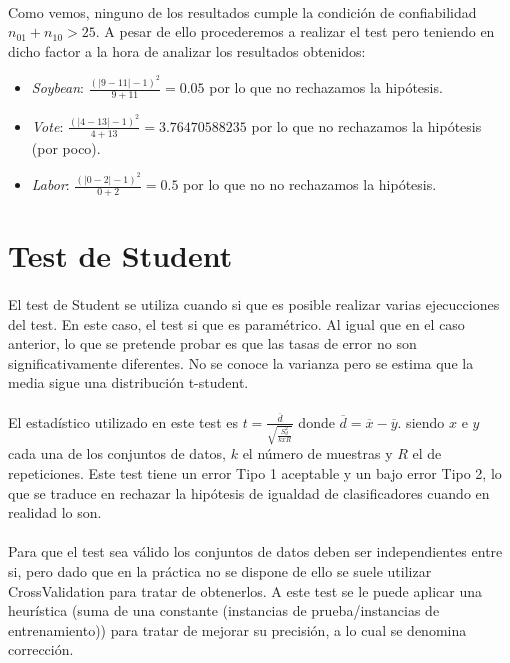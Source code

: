 \documentclass[10pt, a4paper,spanish]{article}
\begin{document}
		\paragraph{}
		Como vemos, ninguno de los resultados cumple la condición de confiabilidad $n_{01} + n_{10} > 25$. A pesar de ello procederemos a realizar el test pero teniendo en dicho factor a la hora de analizar los resultados obtenidos:

		\begin{itemize}
			\item \emph{Soybean}: $\frac{(|9-11|-1)^2}{9+11} = 0.05$ por lo que no rechazamos la hipótesis.
			\item \emph{Vote}: $\frac{(|4-13|-1)^2}{4+13} = 3.76470588235$ por lo que no rechazamos la hipótesis (por poco).
			\item \emph{Labor}: $\frac{(|0-2|-1)^2}{0+2} = 0.5$ por lo que no no rechazamos la hipótesis.
		\end{itemize}


	\section{Test de Student}

		\paragraph{}
		El test de Student se utiliza cuando si que es posible realizar varias ejecucciones del test. En este caso, el test si que es paramétrico. Al igual que en el caso anterior, lo que se pretende probar es que las tasas de error no son significativamente diferentes. No se conoce la varianza pero se estima que la media sigue una distribución t-student.

		\paragraph{}
		El estadístico utilizado en este test es $t = \frac{\overline{d}}{\sqrt{\frac{S^2_d}{k x R}}}$ donde $\overline{d} = \overline{x} - \overline{y}$. siendo $x$ e $y$ cada una de los conjuntos de datos, $k$ el número de muestras y $R$ el de repeticiones. Este test tiene un error Tipo 1 aceptable y un bajo error Tipo 2, lo que se traduce en rechazar la hipótesis de igualdad de clasificadores cuando en realidad lo son.

		\paragraph{}
		Para que el test sea válido los conjuntos de datos deben ser independientes entre si, pero dado que en la práctica no se dispone de ello se suele utilizar CrossValidation para tratar de obtenerlos. A este test se le puede aplicar una heurística (suma de una constante (instancias de prueba/instancias de entrenamiento)) para tratar de mejorar su precisión, a lo cual se denomina corrección.
\end{document}
